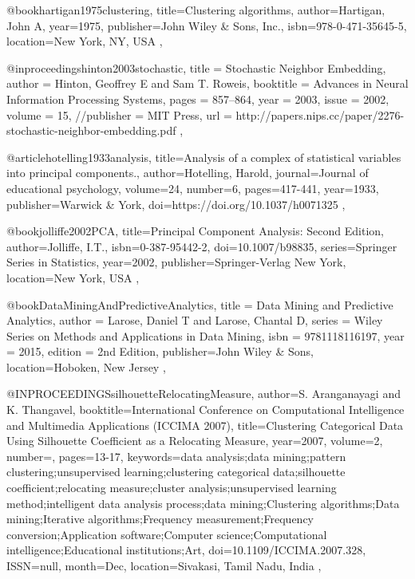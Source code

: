 @book{hartigan1975clustering,
  title={Clustering algorithms},
  author={Hartigan, John A},
  year={1975},
  publisher={John Wiley \& Sons, Inc.},
  isbn={978-0-471-35645-5},
  location={New York, NY, USA}
},

@inproceedings{hinton2003stochastic,
  title = {Stochastic Neighbor Embedding},
  author = {Hinton, Geoffrey E and Sam T. Roweis},
  booktitle = {Advances in Neural Information Processing Systems},
  pages = {857--864},
  year = {2003},
  issue = {2002},
  volume = {15},
  //publisher = {MIT Press},
  url = {http://papers.nips.cc/paper/2276-stochastic-neighbor-embedding.pdf}
},

@article{hotelling1933analysis,
  title={Analysis of a complex of statistical variables into principal components.},
  author={Hotelling, Harold},
  journal={Journal of educational psychology},
  volume={24},
  number={6},
  pages={417-441},
  year={1933},
  publisher={Warwick \& York},
  doi={https://doi.org/10.1037/h0071325}
},

@book{jolliffe2002PCA,
  title={Principal Component Analysis: Second Edition},
  author={Jolliffe, I.T.},
  isbn={0-387-95442-2},
  doi={10.1007/b98835},
  series={Springer Series in Statistics},
  year={2002},
  publisher={Springer-Verlag New York},
  location={New York, USA}
},

@book{DataMiningAndPredictiveAnalytics,
  title = {Data Mining and Predictive Analytics},
  author = {Larose, Daniel T and Larose, Chantal D},
  series = {Wiley Series on Methods and Applications in Data Mining},
  isbn = {9781118116197},
  year = {2015},
  edition = {2nd Edition},
  publisher={John Wiley \& Sons},
  location={Hoboken, New Jersey}
},






















@INPROCEEDINGS{silhouetteRelocatingMeasure, 
  author={S. {Aranganayagi} and K. {Thangavel}}, 
  booktitle={International Conference on Computational Intelligence and Multimedia Applications (ICCIMA 2007)}, 
  title={Clustering Categorical Data Using Silhouette Coefficient as a Relocating Measure}, 
  year={2007}, 
  volume={2}, 
  number={}, 
  pages={13-17}, 
  keywords={data analysis;data mining;pattern clustering;unsupervised learning;clustering categorical data;silhouette coefficient;relocating measure;cluster analysis;unsupervised learning method;intelligent data analysis process;data mining;Clustering algorithms;Data mining;Iterative algorithms;Frequency measurement;Frequency conversion;Application software;Computer science;Computational intelligence;Educational institutions;Art}, 
  doi={10.1109/ICCIMA.2007.328}, 
  ISSN={null}, 
  month={Dec},
  location={Sivakasi, Tamil Nadu, India }
},




